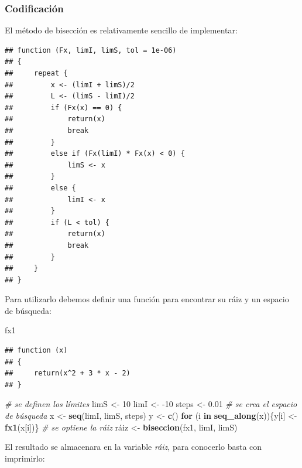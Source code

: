 \documentclass[11pt,]{article}
\newenvironment{Shaded}{\begin{snugshade}}{\end{snugshade}}
\newcommand{\CommentTok}[1]{\textcolor[rgb]{0.56,0.35,0.01}{\textit{#1}}}
\newcommand{\ControlFlowTok}[1]{\textcolor[rgb]{0.13,0.29,0.53}{\textbf{#1}}}
\newcommand{\DecValTok}[1]{\textcolor[rgb]{0.00,0.00,0.81}{#1}}
\newcommand{\FloatTok}[1]{\textcolor[rgb]{0.00,0.00,0.81}{#1}}
\newcommand{\KeywordTok}[1]{\textcolor[rgb]{0.13,0.29,0.53}{\textbf{#1}}}
\newcommand{\NormalTok}[1]{#1}
\newcommand{\StringTok}[1]{\textcolor[rgb]{0.31,0.60,0.02}{#1}}
\begin{document}
\newpage

\hypertarget{codificaciuxf3n}{%
\subsubsection{Codificación}\label{codificaciuxf3n}}

El método de bisección es relativamente sencillo de implementar:

\begin{verbatim}
## function (Fx, limI, limS, tol = 1e-06) 
## {
##     repeat {
##         x <- (limI + limS)/2
##         L <- (limS - limI)/2
##         if (Fx(x) == 0) {
##             return(x)
##             break
##         }
##         else if (Fx(limI) * Fx(x) < 0) {
##             limS <- x
##         }
##         else {
##             limI <- x
##         }
##         if (L < tol) {
##             return(x)
##             break
##         }
##     }
## }
\end{verbatim}

Para utilizarlo debemos definir una función para encontrar su ráiz y un
espacio de búsqueda:

\begin{Shaded}
\begin{Highlighting}[]
\NormalTok{fx1}
\end{Highlighting}
\end{Shaded}

\begin{verbatim}
## function (x) 
## {
##     return(x^2 + 3 * x - 2)
## }
\end{verbatim}

\begin{Shaded}
\begin{Highlighting}[]
\CommentTok{# se definen los límites}
\NormalTok{limS <-}\StringTok{ }\DecValTok{10}
\NormalTok{limI <-}\StringTok{ }\DecValTok{-10}
\NormalTok{steps <-}\StringTok{ }\FloatTok{0.01}
\CommentTok{# se crea el espacio de búsqueda}
\NormalTok{x <-}\StringTok{ }\KeywordTok{seq}\NormalTok{(limI, limS, steps)}
\NormalTok{y <-}\StringTok{ }\KeywordTok{c}\NormalTok{()}
\ControlFlowTok{for}\NormalTok{ (i }\ControlFlowTok{in} \KeywordTok{seq_along}\NormalTok{(x))\{y[i] <-}\StringTok{ }\KeywordTok{fx1}\NormalTok{(x[i])\}}
\CommentTok{# se optiene la ráiz}
\NormalTok{ráiz <-}\StringTok{ }\KeywordTok{biseccion}\NormalTok{(fx1, limI, limS)}
\end{Highlighting}
\end{Shaded}

El resultado se almacenara en la variable \emph{ráiz}, para conocerlo
basta con imprimirlo:
\end{document}
